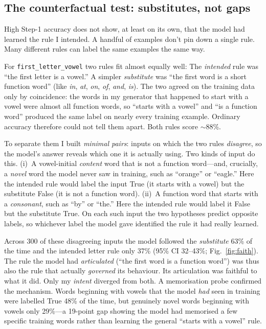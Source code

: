 \documentclass[10pt,twocolumn]{article}
\newcommand{\rulename}[1]{\texttt{#1}}
\begin{document}
\subsection{The counterfactual test: substitutes, not gaps}
\label{sec:cf}
High Step-1 accuracy does not show, at least on its own, that the model had learned the rule I
intended. A handful of examples don't pin down a single rule. Many
different rules can label the same examples the same way.

For \rulename{first\_letter\_vowel} two rules fit almost equally well: The
\emph{intended} rule was ``the first letter is a vowel.'' A simpler \emph{substitute} was
``the first word is a short function word'' (like \emph{in}, \emph{at}, \emph{on},
\emph{of}, \emph{and}, \emph{is}). The two agreed on the training data only by coincidence: the words in my generator that happened to start with a vowel were almost
all function words, so ``starts with a vowel'' and ``is a function word'' produced the same
label on nearly every training example. Ordinary accuracy therefore could not tell them
apart. Both rules score $\sim$88\%.

To separate them I built \emph{minimal pairs}: inputs on which the two rules \emph{disagree},
so the model's answer reveals which one it is actually using. Two kinds of input do this.
(i)~A vowel-initial \emph{content} word that is not a function word---and, crucially, a
\emph{novel} word the model never saw in training, such as ``orange'' or ``eagle.'' Here
the intended rule would label the input \textsf{True} (it starts with a vowel) but the
substitute \textsf{False} (it is not a function word). (ii)~A function word that starts
with a \emph{consonant}, such as ``by'' or ``the.'' Here the intended rule would label it
\textsf{False} but the substitute \textsf{True}. On each such input the two hypotheses
predict opposite labels, so whichever label the model gave identified the rule it had
really learned.

Across 300 of these disagreeing inputs the model followed the \emph{substitute} 63\% of the
time and the intended letter rule only 37\% (95\% CI 32--43\%; Fig.~\ref{fig:faith}). The
rule the model had \emph{articulated} (``the first word is a function word'') was thus also
the rule that actually \emph{governed} its behaviour. Its articulation was faithful to what
it did. Only my \emph{intent} diverged from both. A memorisation probe confirmed the
mechanism. Words beginning with vowels that the model \emph{had} seen in training were labelled
\textsf{True} 48\% of the time, but genuinely novel words beginning with vowels only 29\%---a
19-point gap showing the model had memorised a few specific training words rather than
learning the general ``starts with a vowel'' rule.
\end{document}
